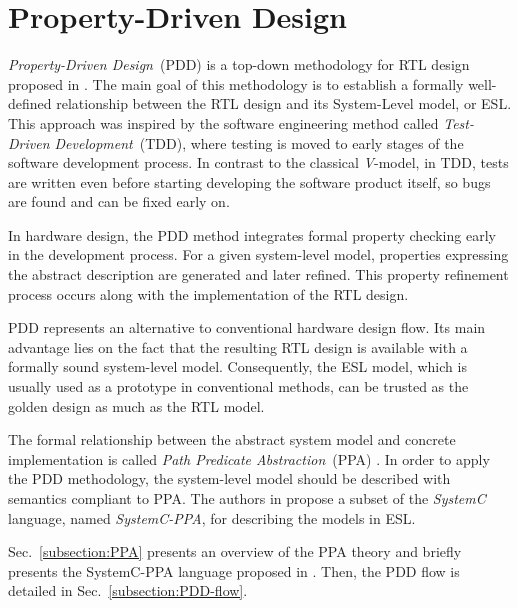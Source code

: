 \section{Property-Driven Design}
\label{section:PDD}

\textit{Property-Driven Design}~(PDD) is a top-down methodology for RTL design proposed in \cite{paper-pdd}. The main goal of this methodology is to establish a formally well-defined relationship between the RTL design and its System-Level model, or ESL. This approach was inspired by the software engineering method called \textit{Test-Driven Development}~(TDD), where testing is moved to early stages of the software development process. In contrast to the classical \textit{V}-model, in TDD, tests are written even before starting developing the software product itself, so bugs are found and can be fixed early on. 

In hardware design, the PDD method integrates formal property checking early in the development process. For a given system-level model, properties expressing the abstract description are generated and later refined. This property refinement process occurs along with the implementation of the RTL design. 

PDD represents an alternative to conventional hardware design flow. Its main advantage lies on the fact that the resulting RTL design is available with a formally sound system-level model. Consequently, the ESL model, which is usually used as a prototype in conventional methods, can be trusted as the golden design as much as the RTL model. 

The formal relationship between the abstract system model and concrete implementation is called \textit{Path Predicate Abstraction}~(PPA) \cite{paper-ppa}. In order to apply the PDD methodology, the system-level model should be described with semantics compliant to PPA. The authors in \cite{paper-pdd} propose a subset of the \textit{SystemC} language, named \textit{SystemC-PPA}, for describing the models in ESL.

Sec.~\ref{subsection:PPA} presents an overview of the PPA theory and briefly presents the SystemC-PPA language proposed in \cite{paper-pdd}. Then, the PDD flow is detailed in Sec.~\ref{subsection:PDD-flow}.

